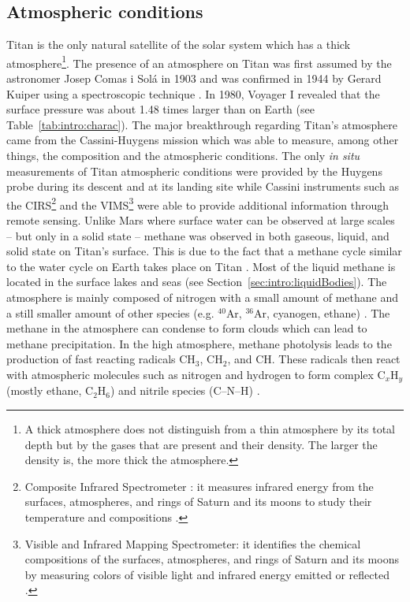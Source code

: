 \subsection{Atmospheric conditions}
\label{sec:intro:atm_cond}
Titan is the only natural satellite of the solar system which has a thick atmosphere\footnote{A thick atmosphere does not distinguish from a thin atmosphere by its total depth but by the gases that are present and their density. The larger the density is, the more thick the atmosphere.}. The presence of an atmosphere on Titan was first assumed by the astronomer Josep Comas i Sol\'a in 1903 and was confirmed in 1944 by Gerard Kuiper using a spectroscopic technique \citep{kuiper1944titan}. In 1980, Voyager I revealed that the surface pressure was about 1.48 times larger than on Earth (see Table~\ref{tab:intro:charac}). The major breakthrough regarding Titan's atmosphere came from the Cassini-Huygens mission which was able to measure, among other things, the composition and the atmospheric conditions. The only \textit{in situ} measurements of Titan atmospheric conditions were provided by the Huygens probe during its descent and at its landing site \citep{fulchignoni2005situ} while Cassini instruments such as the CIRS\footnote{Composite Infrared Spectrometer : it measures infrared energy from the surfaces, atmospheres, and rings of Saturn and its moons to study their temperature and compositions \citep{flasar2004exploring}.} and the VIMS\footnote{Visible and Infrared Mapping Spectrometer: it identifies the chemical compositions of the surfaces, atmospheres, and rings of Saturn and its moons by measuring colors of visible light and infrared energy emitted or reflected \citep{brown2004cassini}.} were able to provide additional information through remote sensing.
Unlike Mars where surface water can be observed at large scales -- but only in a solid state -- methane was observed in both gaseous, liquid, and solid state on Titan's surface. This is due to the fact that a methane cycle similar to the water cycle on Earth takes place on Titan \citep{atreya2006titan}. Most of the liquid methane is located in the surface lakes and seas (see Section~\ref{sec:intro:liquidBodies}). The atmosphere is mainly composed of nitrogen with a small amount of methane and a still smaller amount of other species (e.g. $^{40}$Ar, $^{36}$Ar, cyanogen, ethane) \citep{niemann2005abundances}\citep[for detailed composition, see Table 1 in][]{cordier2009estimate}. The methane in the atmosphere can condense to form clouds \citep{toon1988methane,griffith2000detection,porco2005imaging} which can lead to methane precipitation\citep{toon1988methane}. In the high atmosphere, methane photolysis leads to the production of fast reacting radicals CH$_3$, CH$_2$, and CH. These radicals then react with atmospheric molecules such as nitrogen and hydrogen to form complex C$_x$H$_y$ (mostly ethane, C$_2$H$_6$) and nitrile species (C--N--H) \citep{atreya2006titan}. 

